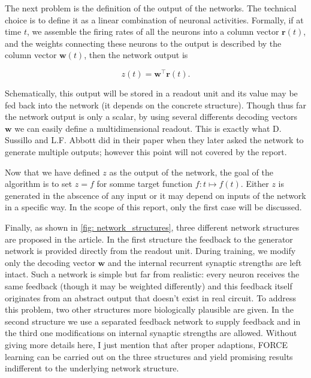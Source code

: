 The next problem is the definition of the output of the networks. The
technical choice is to define it as a linear combination of neuronal
activities. Formally, if at time $t$, we assemble the firing rates of all
the neurons into a column vector $\mathbf{r}(t)$, and the weights 
connecting these neurons to the output is described by the column vector
$\mathbf{w}(t)$, then the network output is

\[z(t) = \mathbf{w}^{\top}\mathbf{r}(t).\]

Schematically, this output will be stored in a readout unit and its
value may be fed back into the network (it depends on the concrete
structure). Though thus far the network output is only a scalar, by using
several differents decoding vectors $\mathbf{w}$ we can easily define
a multidimensional readout. This is exactly what D. Sussillo and L.F.
Abbott did in their paper when they later asked the network to generate
multiple outputs; however this point will not covered by the report.

Now that we have defined $z$ as the output of the network, the goal
of the algorithm is to set $z = f$ for somme target function 
$f: t \mapsto f(t)$. Either $z$ is generated in the abscence of any input
or it may depend on inputs of the network in a specific way. In the scope
of this report, only the first case will be discussed.

Finally, as shown in \autoref{fig: network_structures}, three different 
network structures are proposed in the article. In the first structure
the feedback to the generator network is provided directly from the readout
unit. During training, we modify only the decoding vector $\mathbf{w}$
and the internal recurrent synaptic strengths are left intact.
Such a network is simple but far from realistic: every neuron receives the
same feedback (though it may be weighted differently) and this feedback
itself originates from an abstract output that doesn't exist in real circuit.
To address this problem, two other structures more biologically plausible
are given. In the second structure we use a separated feedback network to 
supply feedback and in the third one modifications on internal synaptic
strengths are allowed. Without giving more details here, I just mention 
that after proper adaptions, FORCE learning can be carried out on the
three structures and yield promising results indifferent to the
underlying network structure.


